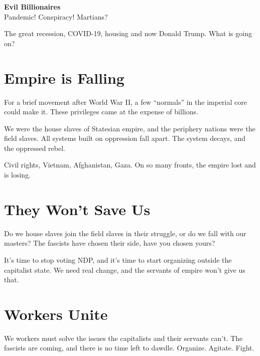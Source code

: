 \documentclass[10pt, oneside, a5paper]{article}
\author{}
\date{}
\begin{document}
{%
  \raggedright{}
  {\bfseries{}\LARGE{}Evil Billionaires}\\
  Pandemic! Conspiracy! Martians?%
}

\bigskip{}

The great recession, COVID-19, housing and now Donald Trump. What is
going on?

\section*{Empire is Falling}

For a brief movement after World War II, a few ``normals'' in the
imperial core could make it. These privileges came at the expense of
billions.

We were the house slaves of Statesian empire, and the periphery
nations were the field slaves. All systems built on oppression fall
apart. The system decays, and the oppressed rebel.

Civil rights, Vietnam, Afghanistan, Gaza. On so many fronts, the
empire lost and is losing.

\section*{They Won't Save Us}

Do we house slaves join the field slaves in their struggle, or do we
fall with our masters?  The fascists have chosen their side, have you
chosen yours?

It's time to stop voting {NDP}, and it's time to start organizing
outside the capitalist state.  We need real change, and the servants
of empire won't give us that.

\section*{Workers Unite}

We workers must solve the issues the capitalists and their servants
can't. The fascists are coming, and there is no time left to
dawdle. Organize. Agitate. Fight.

\end{document}
